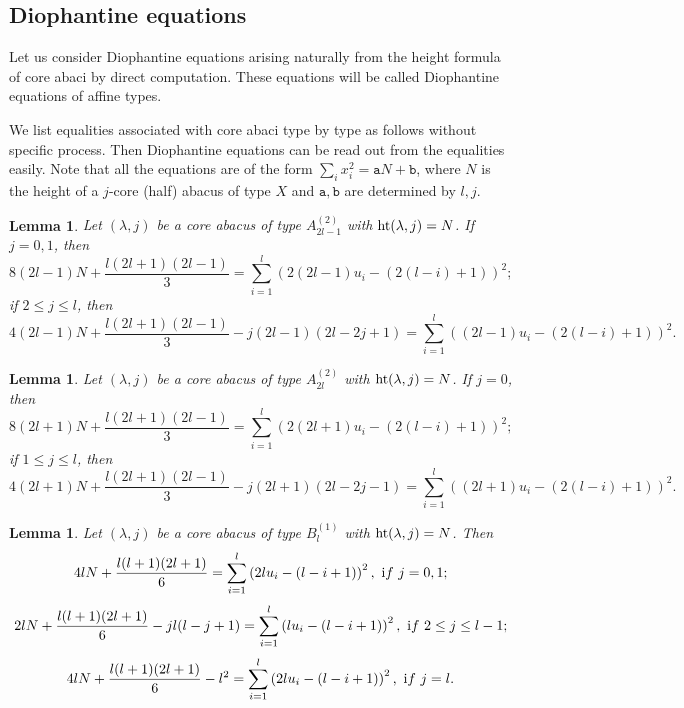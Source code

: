 \documentclass[11pt]{amsart}
\theoremstyle{plain}
\numberwithin{equation}{subsection}
\newtheorem{lemma}[theorem]{Lemma}
\newcommand{\lam}{\lambda}
\begin{document}
\medskip



\subsection{Diophantine equations}
Let us consider Diophantine equations arising naturally from the height formula of core abaci by direct computation. 
These equations will be called Diophantine equations of affine types.

We list equalities associated with core abaci type by type as follows without specific process.
Then Diophantine equations can be read out from the equalities easily. 
Note that all the equations are of the form
$\sum_ix_i^2=\mathtt{a}N+\mathtt{b}$, where $N$ is the height of a $j$-core (half) abacus of type $X$ and $\mathtt{a}, \mathtt{b}$ are determined by $l, j$. 

\begin{lemma}\label{4.9}
Let $(\lam, j)$ be a core abacus of type $A_{2l-1}^{(2)}$ with ${\rm ht}(\lambda, j)=N$. 
If $j=0, 1$, then
$$8(2l-1)N+\frac{l(2l+1)(2l-1)}{3}=\sum_{i=1}^l \left( 2(2l-1)u_i -( 2(l-i)+1) \right)^2;$$
if $2\leq j\leq l$, then
$$4(2l-1)N+\frac{l(2l+1)(2l-1)}{3}-j(2l-1)(2l-2j+1)=\sum_{i=1}^l \left( (2l-1)u_i -( 2(l-i)+1) \right)^2.$$ 
\end{lemma}

\begin{lemma}\label{4.10}
Let $(\lam, j)$ be a core abacus of type $A_{2l}^{(2)}$  with ${\rm ht}(\lambda, j)=N$. 
If $j=0$, then	
$$8(2l+1)N+\frac{l(2l+1)(2l-1)}{3}=\sum_{i=1}^l \left( 2(2l+1)u_i -( 2(l-i)+1) \right)^2;$$
if $1\leq j\leq l$, then
$$4(2l+1)N+\frac{l(2l+1)(2l-1)}{3}-j(2l+1)(2l-2j-1)=\sum_{i=1}^l \left( (2l+1)u_i -( 2(l-i)+1) \right)^2.$$
\end{lemma}

\begin{lemma}\label{4.11}
Let $(\lam, j)$ be a core abacus of type $B_l^{(1)}$ with ${\rm ht}(\lambda, j)=N$. Then
$$4lN+\frac{l(l+1)(2l+1)}{6}=\sum_{i=1}^l \left( 2lu_i - (l-i+1) \right)^2, \,\,{\text if}\,\, j=0,1;$$
$$2lN+\frac{l(l+1)(2l+1)}{6}-jl(l-j+1)=\sum_{i=1}^l \left( lu_i - (l-i+1) \right)^2, \,\,{\text if}\,\, 2\leq j\leq l-1;$$
$$	4lN+\frac{l(l+1)(2l+1)}{6}-l^2=\sum_{i=1}^l \left( 2lu_i - (l-i+1) \right)^2, \,\,{\text if} \,\,j=l.$$
\end{lemma}
\end{document}
